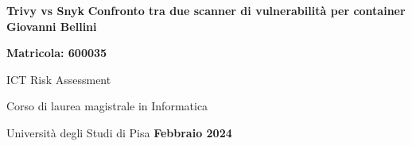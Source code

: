 \documentclass[12pt]{report}
\begin{document}
\begin{center}
   \vspace*{1cm}
   \Huge
   \textbf{Trivy vs Snyk}
   \vspace{0.5cm}
   \Large
   \vfill
   \textbf{Confronto tra due scanner di vulnerabilità per container}
   \vspace{1.5cm}
   \large
   \vfill
   \textbf{Giovanni Bellini}

   \textbf{Matricola: 600035}

   ICT Risk Assessment

      {Corso di laurea magistrale in Informatica}

      {Università degli Studi di Pisa}
   \vfill
   \Large
   \textbf{Febbraio 2024}
\end{center}

\pagebreak
\tableofcontents



\end{document}
